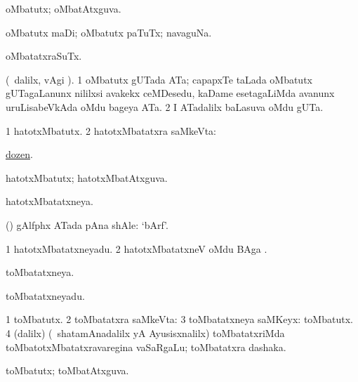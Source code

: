 \bentry
{}
\gl{\gu}
\bmng
oMbatutx; oMbatAtxguva. 
\emng
\eentry

\bentry
{}
\gl{\gu}
\bmng
oMbatutx maDi; oMbatutx paTuTx; navaguNa. 
\emng
\eentry

\bentry
{}
\gl{\kirxvi}
\bmng
oMbatatxraSuTx. 
\emng
\eentry

\bentry
{}
\gl{\nA}
\bmng
(\sA\ \bava dalilx, \Eva vAgi \parx). 
\bnum
\num{1} oMbatutx gUTada ATa; capapxTe taLada oMbatutx gUTagaLanunx nililxsi avakekx ceMDesedu, kaDame esetagaLiMda avanunx uruLisabeVkAda oMdu bageya ATa. 
\num{2} I ATadalilx baLasuva oMdu gUTa. 
\enum
\emng
\eentry

\bentry
{}
\gl{\gu}
\bmng
\bnum
\num{1} hatotxMbatutx. 
\num{2} hatotxMbatatxra saMkeVta:  
\enum
\emng

\noindent
\gl{\pagu}
\bmng
{} \hyperref{kandict_d.pdf}{D}{dozen nuga(6)}{dozen}. 
\emng
\eentry

\bentry
{}
\gl{\gu}
\bmng
hatotxMbatutx; hatotxMbatAtxguva. 
\emng
\eentry

\bentry
{}
\gl{\gu}
\bmng
hatotxMbatatxneya. 
\emng

\noindent
\gl{\pagu}
\bmng
{}(\hA) gAlfphx ATada pAna shAle: `bArf'. 
\emng
\eentry

\bentry
{}
\gl{\nA}
\bmng
\bnum
\num{1} hatotxMbatatxneyadu. 
\num{2} hatotxMbatatxneV oMdu BAga . 
\enum
\emng
\eentry

\bentry
{}
\gl{\gu}
\bmng
toMbatatxneya. 
\emng
\eentry

\bentry
{}
\gl{\nA}
\bmng
toMbatatxneyadu. 
\emng
\eentry

\bentry
{}
\gl{\nA}
\bmng
\bnum
\num{1} toMbatutx. 
\num{2} toMbatatxra saMkeVta:  
\num{3} toMbatatxneya saMKeyx: toMbatutx. 
\num{4} (\bava dalilx) (\kanmu\ shatamAnadalilx yA Ayusisxnalilx) toMbatatxriMda toMbatotxMbatatxravaregina vaSaRgaLu; toMbatatxra dashaka. 
\enum
\emng
\eentry

\bentry
{}
\gl{\gu}
\bmng
toMbatutx; toMbatAtxguva. 
\emng

